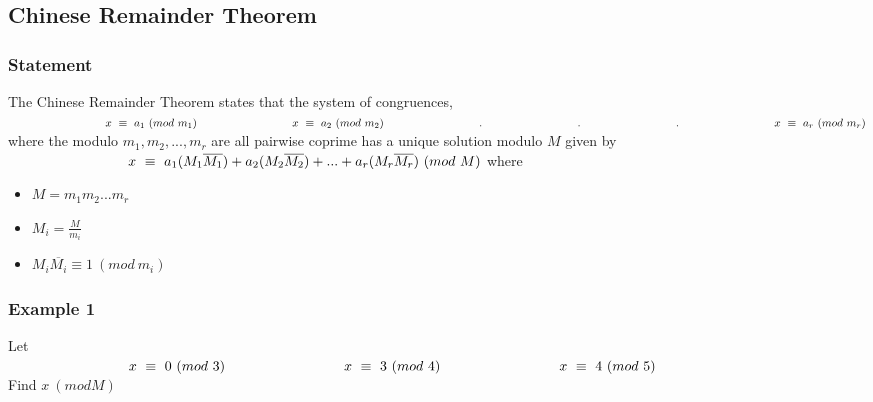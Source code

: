 \documentclass{article}
\newcommand\tab[1][3cm]{\hspace*{#1}}
\begin{document}
\subsection{Chinese Remainder Theorem}
	\subsubsection{Statement}
	The Chinese Remainder Theorem states that the system of congruences,\\
		$
			\tab	x~\equiv~a_1~(mod~m_1)\\
			\tab	x~\equiv~a_2~(mod~m_2)\\
			\tab	.\\
			\tab	.\\
			\tab	.\\
			\tab	x~\equiv~a_r~(mod~m_r)\\
		$\\
	where the modulo $m_1, m_2,...,m_r$ are all pairwise coprime has a unique solution modulo $M$ given by\\
		$
			\tab	x~\equiv~a_1(M_1\overline{M_1}) + a_2(M_2\overline{M_2}) + ... + a_r(M_r\overline{M_r})~(mod~M)
		$ 
		where
	\begin{itemize}
		\item $M = m_1m_2...m_r$
		\item $M_i = \frac{M}{m_i}$
		\item $M_i\overline{M_i} \equiv 1~(mod~m_i)$
	\end{itemize}
	
	\subsubsection{Example 1}
	Let\\
		$
			\tab	x~\equiv~0~(mod~3)\\
			\tab	x~\equiv~3~(mod~4)\\
			\tab	x~\equiv~4~(mod~5)\\
		$\\
	Find $x~(mod M)$
	
\end{document}
